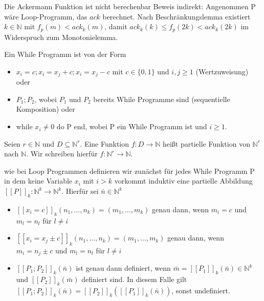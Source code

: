 \documentclass[avery5371]{flashcards}
\begin{document}
\begin{flashcard}[Satz]{ Die Ackermann Funktion ist nicht berechenbar}
Beweis indirekt: Angenommen P wäre Loop-Programm, das $ack$ berechnet. Nach Beschränkungslemma existiert $k\in\mathbb{N}$ mit $f_p(m)< ack_k(m)$, damit $ack_k(k)\leq f_p(2k)< ack_k(2k)$ im Widerspruch zum Monotonielemma. 
\end{flashcard}

\begin{flashcard}[Definition]{ Ein While Programm ist von der Form}
\begin{itemize}
\item $x_i=c; x_i=x_j+c; x_i=x_j-c$ mit $c\in\{0,1\}$ und $i,j\geq 1$ (Wertzuweisung) oder
\item $P_1;P_2$, wobei $P_1$ und $P_2$ bereits While Programme sind (sequentielle Komposition) oder
\item while $x_i\not = 0$ do P end, wobei P ein While Programm ist und $i\geq 1$.
\end{itemize}
\end{flashcard}

\begin{flashcard}[Definition]{} 
Seien $r\in\mathbb{N}$ und $D\subseteq\mathbb{N}^r$. Eine Funktion $f:D\rightarrow\mathbb{N}$ heißt partielle Funktion von $\mathbb{N}^r$ nach $\mathbb{N}$. Wir schreiben hierfür $f:\mathbb{N}^r \rightarrow\mathbb{N}$.
\end{flashcard}

\begin{flashcard}[Definition]{} wie bei Loop Programmen definieren wir zunächst für jedes While Programm P in dem keine Variable $x_i$ mit $i>k$ vorkommt induktiv eine partielle Abbildung $[[P]]_k:\mathbb{N}^k \rightarrow\mathbb{N}^k$. Hierfür sei $\bar{n}\in\mathbb{N}^k$
    \begin{itemize}
\item $[[x_i=c]]_k(n_1,...,n_k)=(m_1,...,m_k)$ genau dann, wenn $m_i=c$ und $m_l=n_l$ für $l\not = i$
\item $[[x_i=x_j \pm c]]_k(n_1,...,n_k)=(m_1,...,m_k)$ genau dann, wenn $m_i=n_j\pm c$ und $m_l=n_l$ für $l\not = i$
\item $[[P_1; P_2]]_k(\bar{n})$ ist genau dann definiert, wenn $\bar{m}=[[P_1]]_k(\bar{n})\in\mathbb{N}^k$ und $[[P_2]]_k(\bar{m})$ definiert sind. In diesem Falle gilt $[[P_1; P_2]]_k(\bar{n})=[[P_2]]_k([[P_1]]_k(\bar{n}))$, sonst undefiniert.
\end{itemize}
\end{flashcard}
\end{document}
